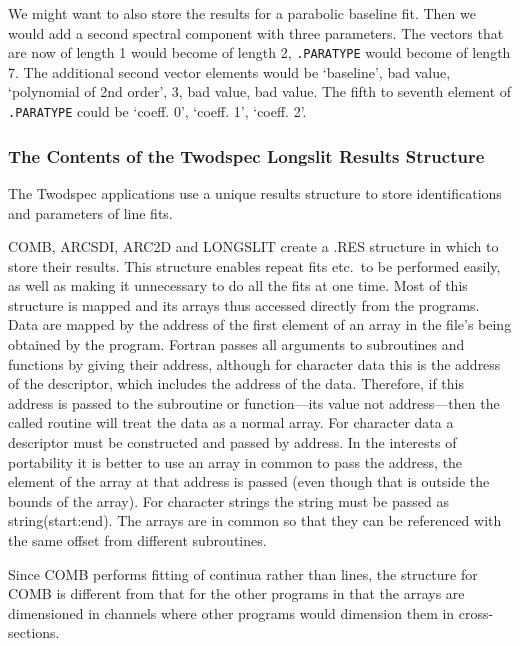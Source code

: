 \begin{enumerate}
   We might want to also store the results for a parabolic baseline
   fit. Then we would add a second spectral component with three
   parameters. The vectors that are now of length 1 would become of
   length 2, {\tt .PARATYPE} would become of length 7. The additional
   second vector elements would be `baseline', bad value, `polynomial
   of 2nd order', 3, bad value, bad value. The fifth to seventh element
   of {\tt .PARATYPE} could be `coeff. 0', `coeff. 1', `coeff. 2'.

\end{enumerate}

\subsubsection{\label{the_contents_of_the_longslit_structure}%
The Contents of the Twodspec Longslit Results Structure}
\label{ap.res}

The Twodspec applications use a unique results structure to store
identifications and parameters of line fits.

COMB, ARCSDI, ARC2D and LONGSLIT create a .RES structure in which to
store their results.  This structure enables repeat fits etc.\ to be
performed easily, as well as making it unnecessary to do all the fits at
one time.  Most of this structure is mapped and its arrays thus accessed
directly from the programs.  Data are mapped by the address of the
first element of an array in the file's being obtained by the program.
Fortran passes all arguments to subroutines and functions by giving
their address, although for character data this is the address of the
descriptor, which includes the address of the data.  Therefore, if
this address is passed to the subroutine or function---its value not
address---then the called routine will treat the data as a normal
array.  For character data a descriptor must be constructed and passed
by address.  In the interests of portability it is better to use an
array in common to pass the address, the element of the array at that
address is passed (even though that is outside the bounds of the
array). For character strings the string must be passed as
string(start:end). The arrays are in common so that they can be
referenced with the same offset from different subroutines.

Since COMB performs fitting of continua rather than lines, the structure
for COMB is different from that for the other programs in that the arrays
are dimensioned in channels where other programs would dimension them in
cross-sections.

